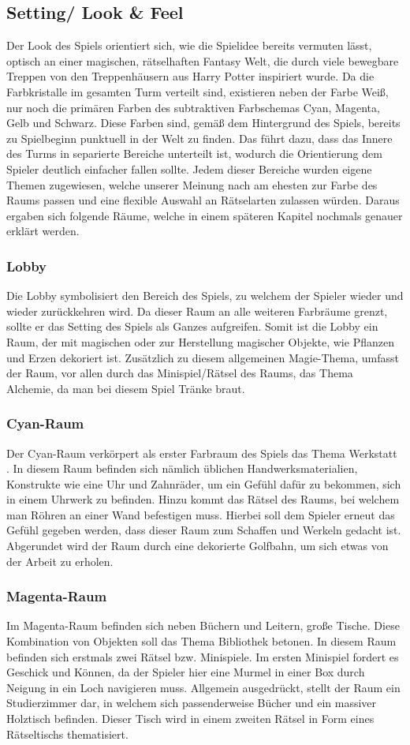 \subsection{Setting/ Look \& Feel}
Der Look des Spiels orientiert sich, wie die Spielidee bereits vermuten lässt, optisch an einer magischen, rätselhaften Fantasy Welt, die durch viele bewegbare Treppen von den Treppenhäusern aus Harry Potter inspiriert wurde. Da die Farbkristalle im gesamten Turm verteilt sind, existieren neben der Farbe Weiß, nur noch die primären Farben des subtraktiven Farbschemas Cyan, Magenta, Gelb und Schwarz. Diese Farben sind, gemäß dem Hintergrund des Spiels, bereits zu Spielbeginn punktuell in der Welt zu finden. Das führt dazu, dass das Innere des Turms in separierte Bereiche unterteilt ist, wodurch die Orientierung dem Spieler deutlich einfacher fallen sollte. Jedem dieser Bereiche wurden eigene Themen zugewiesen, welche unserer Meinung nach am ehesten zur Farbe des Raums passen und eine flexible Auswahl an Rätselarten zulassen würden. Daraus ergaben sich folgende Räume, welche in einem späteren Kapitel nochmals genauer erklärt werden.
\subsubsection{Lobby}
Die Lobby symbolisiert den Bereich des Spiels, zu welchem der Spieler wieder und wieder zurückkehren wird. Da dieser Raum an alle weiteren Farbräume grenzt, sollte er das Setting des Spiels als Ganzes aufgreifen. Somit ist die Lobby ein Raum, der mit magischen oder zur Herstellung magischer Objekte, wie Pflanzen und Erzen dekoriert ist. Zusätzlich zu diesem allgemeinen Magie-Thema, umfasst der Raum, vor allen durch das Minispiel/Rätsel des Raums, das Thema Alchemie, da man bei diesem Spiel Tränke braut.
\subsubsection{Cyan-Raum}
Der Cyan-Raum verkörpert als erster Farbraum des Spiels das Thema \dq Werkstatt \dq. In diesem Raum befinden sich nämlich üblichen Handwerksmaterialien, Konstrukte wie eine Uhr und Zahnräder, um ein Gefühl dafür zu bekommen, sich in einem Uhrwerk zu befinden. Hinzu kommt das Rätsel des Raums, bei welchem man Röhren an einer Wand befestigen muss. Hierbei soll dem Spieler erneut das Gefühl gegeben werden, dass dieser Raum zum Schaffen und Werkeln gedacht ist. Abgerundet wird der Raum durch eine dekorierte Golfbahn, um sich etwas von der Arbeit zu erholen.
\subsubsection{Magenta-Raum}
Im Magenta-Raum befinden sich neben Büchern und Leitern, große Tische. Diese Kombination von Objekten soll das Thema \dq Bibliothek \dq betonen. In diesem Raum befinden sich erstmals zwei Rätsel bzw. Minispiele. Im ersten Minispiel fordert es Geschick und Können, da der Spieler hier eine Murmel in einer Box durch Neigung in ein Loch navigieren muss. Allgemein ausgedrückt, stellt der Raum ein Studierzimmer dar, in welchem sich passenderweise Bücher und ein massiver Holztisch befinden. Dieser Tisch wird in einem zweiten Rätsel in Form eines Rätseltischs thematisiert.
